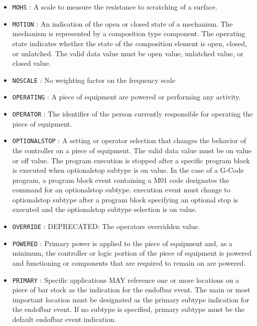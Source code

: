 \begin{itemize}
\item \texttt{MOHS} : A scale to measure the resistance to scratching of a surface. 

\item \texttt{MOTION} : An indication of the open or closed state of a mechanism.   The mechanism is represented by a composition type component. 
 The operating state indicates whether the state of the composition element is open, closed, or unlatched.   
 The valid data value must be open value, unlatched value, or closed value. 

\item \texttt{NO\textunderscore SCALE} : No weighting factor on the frequency scale 

\item \texttt{OPERATING} : A piece of equipment are powered or performing any activity. 

\item \texttt{OPERATOR} : The identifier of the person currently responsible for operating the piece of equipment. 

\item \texttt{OPTIONAL\textunderscore STOP} : A setting or operator selection that changes the behavior of the controller on a piece of equipment. 
 The valid data value must be on value or off value.
 The program execution is stopped after a specific program block is executed when optionalstop subtype is on value.    
 In the case of a G-Code program, a program block event containing a M01 code designates the command for an optionalstop subtype. 
 execution event must change to optionalstop subtype after a program block specifying an optional stop is executed and the optionalstop subtype selection is on value. 

\item \texttt{OVERRIDE} : DEPRECATED: The operators overridden value. 

\item \texttt{POWERED} : Primary  power is  applied  to the  piece  of  equipment and,  as  a minimum, the controller or logic portion of the piece of equipment is powered and functioning or components that are required to remain on are powered. 

\item \texttt{PRIMARY} : Specific applications MAY reference one or more locations on a piece of bar stock as the indication for the endofbar event. The main or most important location must be designated as the primary subtype indication for the endofbar event.   
 If no subtype is specified, primary subtype must be the default endofbar event indication. 


\end{itemize}
